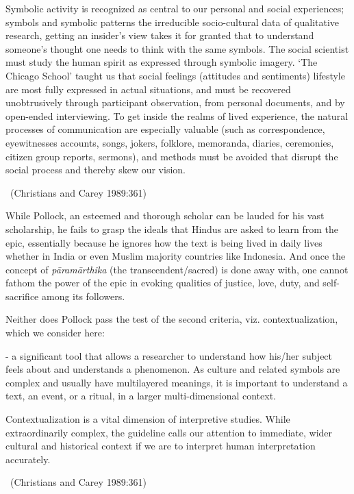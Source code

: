\begin{myquote}
Symbolic activity is recognized as central to our personal and social experiences; symbols and symbolic patterns the irreducible socio-cultural data of qualitative research, getting an insider’s view takes it for granted that to understand someone’s thought one needs to think with the same symbols. The social scientist must study the human spirit as expressed through symbolic imagery. ‘The Chicago School’ taught us that social feelings (attitudes and sentiments) lifestyle are most fully expressed in actual situations, and must be recovered unobtrusively through participant observation, from personal documents, and by open-ended interviewing. To get inside the realms of lived experience, the natural processes of communication are especially valuable (such as correspondence, eyewitnesses accounts, songs, jokers, folklore, memoranda, diaries, ceremonies, citizen group reports, sermons), and methods must be avoided that disrupt the social process and thereby skew our vision. 

~\hfill (Christians and Carey 1989:361)
\end{myquote}

While Pollock, an esteemed and thorough scholar can be lauded for his vast scholarship, he fails to grasp the ideals that Hindus are asked to learn from the epic, essentially because he ignores how the text is being lived in daily lives whether in India or even Muslim majority countries like Indonesia. And once the concept of \textit{pāramārthika} (the transcendent/sacred) is done away with, one cannot fathom the power of the epic in evoking qualities of justice, love, duty, and self-sacrifice among its followers.

Neither does Pollock pass the test of the second criteria, viz. contextualization, which we consider here:

\begin{myquote}
- a significant tool that allows a researcher to understand how his/her subject feels about and understands a phenomenon. As culture and related symbols are complex and usually have multilayered meanings, it is important to understand a text, an event, or a ritual, in a larger multi-dimensional context.
\end{myquote}

\begin{myquote}
Contextualization is a vital dimension of interpretive studies. While extraordinarily complex, the guideline calls our attention to immediate, wider cultural and historical context if we are to interpret human interpretation accurately. 

~\hfill (Christians and Carey 1989:361)
\end{myquote}

